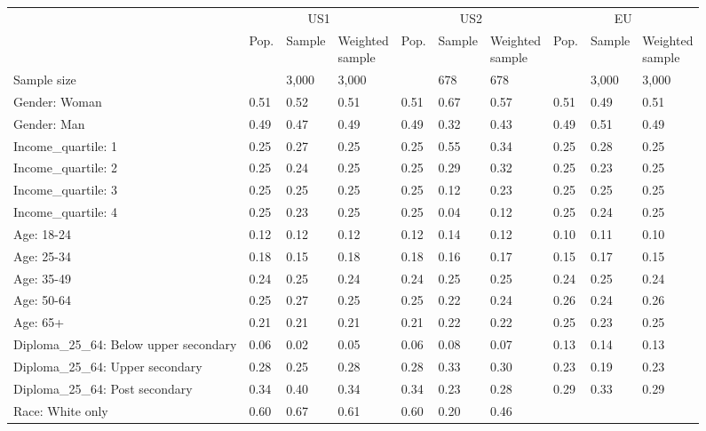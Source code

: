 
\begin{tabular}[t]{llllllllll}
\toprule
\multicolumn{1}{c}{} & \multicolumn{3}{c}{US1} & \multicolumn{3}{c}{US2} & \multicolumn{3}{c}{EU} \\
\cmidrule(l{3pt}r{3pt}){2-4} \cmidrule(l{3pt}r{3pt}){5-7} \cmidrule(l{3pt}r{3pt}){8-10}
  & Pop. & Sample & \makecell{Weighted\\sample} & Pop. & Sample & \makecell{Weighted\\sample} & Pop. & Sample & \makecell{Weighted\\sample}\\
\midrule
Sample size &  & 3,000 & 3,000 &  & 678 & 678 &  & 3,000 & 3,000\\
\addlinespace
Gender: Woman & 0.51 & 0.52 & 0.51 & 0.51 & 0.67 & 0.57 & 0.51 & 0.49 & 0.51\\
Gender: Man & 0.49 & 0.47 & 0.49 & 0.49 & 0.32 & 0.43 & 0.49 & 0.51 & 0.49\\
\addlinespace
Income\_quartile: 1 & 0.25 & 0.27 & 0.25 & 0.25 & 0.55 & 0.34 & 0.25 & 0.28 & 0.25\\
Income\_quartile: 2 & 0.25 & 0.24 & 0.25 & 0.25 & 0.29 & 0.32 & 0.25 & 0.23 & 0.25\\
Income\_quartile: 3 & 0.25 & 0.25 & 0.25 & 0.25 & 0.12 & 0.23 & 0.25 & 0.25 & 0.25\\
Income\_quartile: 4 & 0.25 & 0.23 & 0.25 & 0.25 & 0.04 & 0.12 & 0.25 & 0.24 & 0.25\\
\addlinespace
Age: 18-24 & 0.12 & 0.12 & 0.12 & 0.12 & 0.14 & 0.12 & 0.10 & 0.11 & 0.10\\
Age: 25-34 & 0.18 & 0.15 & 0.18 & 0.18 & 0.16 & 0.17 & 0.15 & 0.17 & 0.15\\
Age: 35-49 & 0.24 & 0.25 & 0.24 & 0.24 & 0.25 & 0.25 & 0.24 & 0.25 & 0.24\\
Age: 50-64 & 0.25 & 0.27 & 0.25 & 0.25 & 0.22 & 0.24 & 0.26 & 0.24 & 0.26\\
Age: 65+ & 0.21 & 0.21 & 0.21 & 0.21 & 0.22 & 0.22 & 0.25 & 0.23 & 0.25\\
\addlinespace
Diploma\_25\_64: Below upper secondary & 0.06 & 0.02 & 0.05 & 0.06 & 0.08 & 0.07 & 0.13 & 0.14 & 0.13\\
Diploma\_25\_64: Upper secondary & 0.28 & 0.25 & 0.28 & 0.28 & 0.33 & 0.30 & 0.23 & 0.19 & 0.23\\
Diploma\_25\_64: Post secondary & 0.34 & 0.40 & 0.34 & 0.34 & 0.23 & 0.28 & 0.29 & 0.33 & 0.29\\
\addlinespace
Race: White only & 0.60 & 0.67 & 0.61 & 0.60 & 0.20 & 0.46 &  &  & \\

\end{tabular}
